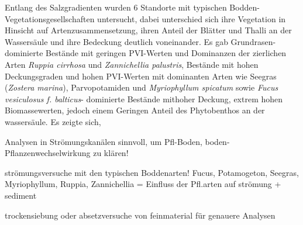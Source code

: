 Entlang des Salzgradienten wurden 6 Standorte mit typischen Bodden-Vegetationsgesellschaften untersucht, dabei unterschied sich ihre Vegetation in Hinsicht auf Artenzusammensetzung, ihren Anteil der Blätter und Thalli an der Wassersäule und ihre Bedeckung deutlich voneinander. Es gab Grundrasen-dominierte Bestände mit geringen PVI-Werten und Dominanzen der zierlichen Arten \textit{Ruppia cirrhosa} und \textit{Zannichellia palustris}, Bestände mit hohen Deckungsgraden und hohen PVI-Werten mit dominanten Arten wie Seegras (\textit{Zostera marina}),  Parvopotamiden und \textit{Myriophyllum spicatum} sowie \textit{Fucus vesiculosus f. balticus}- dominierte Bestände mithoher Deckung, extrem hohen Biomassewerten, jedoch einem Geringen Anteil des Phytobenthos an der wassersäule.
Es zeigte sich, 

Analysen in Strömungskanälen sinnvoll, um Pfl-Boden, boden-Pflanzenwechselwirkung zu klären!

strömungsversuche mit den typischen Boddenarten! Fucus, Potamogeton, Seegras, Myriophyllum, Ruppia, Zannichellia
= Einfluss der Pfl.arten auf strömung + sediment

trockensiebung oder absetzversuche von feinmaterial für genauere Analysen